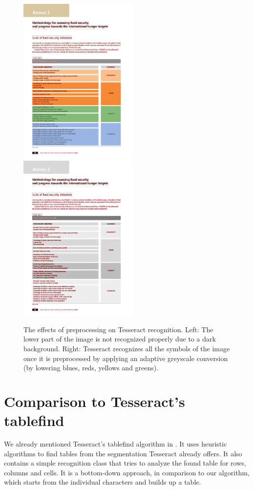 \begin{figure}[t]
\centering

\includegraphics[width=16em]{img/results/im2_noPreproc.png}
\includegraphics[width=16em]{img/results/im2_Preproc.png}

\caption{The effects of preprocessing on Tesseract recognition. Left: The lower part of the image is not recognized properly due to a dark background. Right: Tesseract recognizes all the symbols of the image once it is preprocessed by applying an adaptive greyscale conversion (by lowering blues, reds, yellows and greens).}
\label{fig:preprocessEffectsAdapt}
\end{figure}

\section{Comparison to Tesseract's tablefind} \label{resultsTableFind}

We already mentioned Tesseract's tablefind algorithm in . It uses heuristic algorithms to find tables from the segmentation Tesseract already offers. It also contains a simple recognition class that tries to analyze the found table for rows, columns and cells. It is a bottom-down approach, in comparison to our algorithm, which starts from the individual characters and builds up a table.

